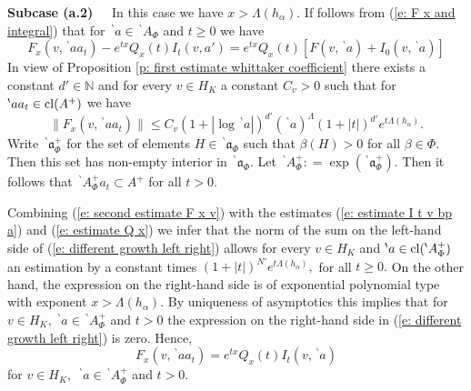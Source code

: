 \documentclass[12pt,a4paper]{article}
\def\medno{\medbreak\noindent}
\def\msy#1{{\mathbb #1}}
\def\N{{\msy N}}
\def\ga{\alpha}
\def\gb{\beta}
\def\got#1{\mathfrak #1}
\def\fa{{\got a}}
\numberwithin{Thm}{section}
\numberwithin{equation}{section}
\def\gL{\Lambda}
\numberwithin{equation}{section}
\def\cl{{\rm cl}}
\def\gL{\Lambda}
\def\bp{\!{\,}^\backprime}
\begin{document}
\medno
{\bf Subcase (a.2)\ \ } In this case we have $x > \gL(h_\ga).$ If follows from 
(\ref{e: F x and integral}) that for $\bp a \in \bp A_\Phi$ and $t \geq 0$ we have 
\begin{equation}
\label{e: different growth left right}
F_x(v, \bp a a_t) -  e^{tx} Q_x(t) I_t (v,a ') = e^{tx} Q_x(t) [F(v,\bp a) +    I_0(v, \bp a)] 
\end{equation}
In view of Proposition \ref{p: first estimate whittaker coefficient} there exists a constant $d' \in \N$ and for every $v \in H_K$ a constant $C_v >0$ such that
for $ \bp aa_t \in \cl(A^+)$ we have 
\begin{equation}
\label{e: second estimate F x v}
\|F_x(v, \bp a a_t)\| \leq C_v  (1 +| \log \bp a|)^{d'} (\bp a)^{\gL} (1 + |t|)^{d'} e^{t \gL(h_\ga)}.
\end{equation} 
Write $\bp \fa_{\Phi}^+$ for the set of elements $H \in \bp\fa_\Phi$ such that 
$\gb(H) >  0$ for all $\gb \in \Phi.$ Then this set has non-empty interior
in $\bp \fa_{\Phi}.$ Let $\bp A_\Phi^+: = \exp (\bp\fa_\Phi^+).$ Then it follows that  
$\bp A_\Phi^+ a_t \subset A^+$ for all $t> 0.$ 

Combining (\ref{e: second estimate F x v}) with the estimates (\ref{e: estimate I t v bp a}) and (\ref{e: estimate Q x}) we infer that the norm of the sum on the left-hand side of (\ref{e: different growth left right}) allows for every $v \in H_K $ 
and $\bp a \in \cl(\bp A_\Phi^+)$ an estimation 
by a constant times $(1 + |t|)^{N'} e^{t\gL(h_\ga)},$ for all $t \geq 0.$
On the other hand, the expression on the right-hand side is of exponential 
polynomial type with exponent $x > \gL(h_\ga).$  
By uniqueness of asymptotics this implies that for $v \in H_K$, 
$\bp a \in \bp A_\Phi^+$ and $t >0$ the expression on the right-hand side
in (\ref{e: different growth left right}) is zero. 
Hence,
\begin{equation}
\label{e: F x equals I t}
F_x(v, \bp a a_t) =  e^{tx} Q_x(t) I_t (v,\bp a) 
\end{equation}  
for $v\in H_K,$ $\bp a \in \bp A_\Phi^+$ and $t > 0. $
\end{document}
